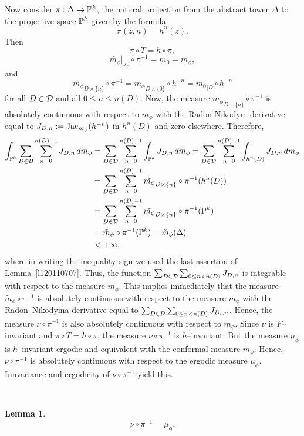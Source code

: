 \documentclass[12pt]{amsart}
\numberwithin{equation}{section}
\newtheorem{lem}[thm]{Lemma}
\def\De{\Delta}               \def\e{\varepsilon}          \def\f{\phi}
\begin{document}
\fr Now consider $\pi:\De\to\Pk$, the natural
projection from the abstract tower $\De$ to the projective space ${\mathbb P}^k$
given by the formula
$$
\pi(z,n)=h^n(z).
$$
Then
\begin{equation}\label{eq120110623}
\pi\circ T =h\circ \pi,
\end{equation}
$$
{\tilde {m_\phi}}\big|_{J_F}\circ\pi^{-1}=m_0=m_\phi,
$$ 
and  
$$
\tilde{m_\phi}_{D\times\{n\}} \circ\pi^{-1} 
={m_\phi}_{D\times\{0\}}\circ h^{-n}
={m_0}_{|D}\circ h^{-n}
$$ 
for all $D\in\mathcal D$ and all $0\le n\le n(D)$.
Now, the measure $\tilde{m_\phi}_{D\times\{n\}} \circ\pi^{-1}$ is
absolutely continuous 
with respect to $m_\phi$ with the Radon-Nikodym derivative equal to
$J_{D,n}:=\text{{\rm Jac}}_{m_\phi}(h^{-n})$ in $h^n(D)$ and zero elsewhere. Therefore,
$$
\aligned
\int_{\Pk}\sum_{D\in\cD}\sum_{n=0}^{n(D)-1}J_{D,n}\,dm_\phi
&=\sum_{D\in\cD}\sum_{n=0}^{n(D)-1}\int_{\Pk}J_{D,n}\,dm_\phi 
 =\sum_{D\in\cD}\sum_{n=0}^{n(D)-1}\int_{h^n(D)}J_{D,n}\,dm_\phi \\
&=\sum_{D\in\cD}\sum_{n=0}^{n(D)-1}\tilde{m_\phi}_{D\times\{n\}}
       \circ\pi^{-1}(h^n(D))\\     
&=\sum_{D\in\cD}\sum_{n=0}^{n(D)-1}\tilde{m_\phi}_{D\times\{n\}}
       \circ\pi^{-1}(\P^k)\\   
&=\tilde m_\phi\circ\pi^{-1}(\Pk) 
 =\tilde m_\phi(\De) \\
&<+\infty,
\endaligned
$$ 
where in writing the inequality sign we used the last assertion of
Lemma~\ref{l120110707}.
Thus, the function $\sum_{D\in\mathcal D}\sum_{0\le n<n(D)}J_{D,n}$ is integrable
with respect to the measure $m_\phi$. This implies immediately that
the measure $\tilde m_\phi\circ\pi^{-1}$ is absolutely continuous with
respect to the measure $m_\phi$ with the Radon--Nikodyma derivative
equal to $\sum_{D\in\mathcal D}\sum_{0\le n<n(D)}J_{D_i,n}$.  
Hence, the measure $\nu\circ\pi^{-1}$ is also absolutely continuous
with respect to $m_\phi$. Since $\nu$ is $F$--invariant and $\pi\circ
T =h\circ \pi$, the measure $\nu\circ\pi^{-1}$ is $h$--invariant. 
But the measure $\mu_\phi$ is $h$--invariant ergodic and
equivalent with the conformal measure $m_\phi$. Hence, $\nu\circ\pi^{-1}$
is absolutely continuous with respect to the ergodic
measure $\mu_\phi$. Innvariance and ergodicity of $\nu\circ\pi^{-1}$
yield this.  

\

\begin{lem}\label{l120110623}
$$
\nu\circ\pi^{-1}=\mu_\phi.
$$
\end{lem} 
\end{document}
